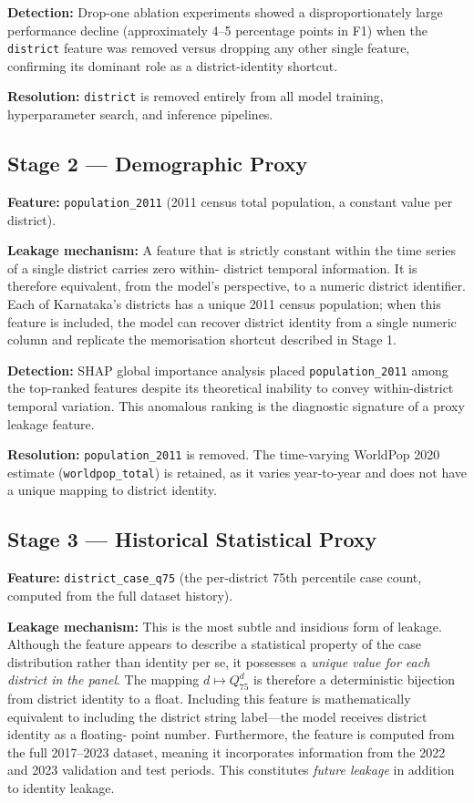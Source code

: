 \documentclass[conference]{IEEEtran}
\begin{document}
\textbf{Detection:} Drop-one ablation experiments showed a
disproportionately large performance decline (approximately 4--5
percentage points in F1) when the \texttt{district} feature was
removed versus dropping any other single feature, confirming its
dominant role as a district-identity shortcut.

\textbf{Resolution:} \texttt{district} is removed entirely from all
model training, hyperparameter search, and inference pipelines.

\subsection{Stage 2 --- Demographic Proxy}

\textbf{Feature:} \texttt{population\_2011} (2011 census total
population, a constant value per district).

\textbf{Leakage mechanism:} A feature that is strictly constant
within the time series of a single district carries zero within-
district temporal information. It is therefore equivalent, from the
model's perspective, to a numeric district identifier. Each of
Karnataka's districts has a unique 2011 census population; when this
feature is included, the model can recover district identity from a
single numeric column and replicate the memorisation shortcut
described in Stage 1.

\textbf{Detection:} SHAP global importance analysis placed
\texttt{population\_2011} among the top-ranked features despite its
theoretical inability to convey within-district temporal variation.
This anomalous ranking is the diagnostic signature of a proxy
leakage feature.

\textbf{Resolution:} \texttt{population\_2011} is removed.
The time-varying WorldPop 2020 estimate (\texttt{worldpop\_total})
is retained, as it varies year-to-year and does not have a unique
mapping to district identity.

\subsection{Stage 3 --- Historical Statistical Proxy}
\label{subsec:q75_leakage}

\textbf{Feature:} \texttt{district\_case\_q75} (the per-district
75th percentile case count, computed from the full dataset history).

\textbf{Leakage mechanism:} This is the most subtle and insidious
form of leakage. Although the feature appears to describe a
statistical property of the case distribution rather than identity
per se, it possesses a \emph{unique value for each district in the
panel}. The mapping $d \mapsto Q_{75}^{d}$ is therefore a
deterministic bijection from district identity to a float. Including
this feature is mathematically equivalent to including the district
string label---the model receives district identity as a floating-
point number. Furthermore, the feature is computed from the full
2017--2023 dataset, meaning it incorporates information from the
2022 and 2023 validation and test periods. This constitutes
\emph{future leakage} in addition to identity leakage.
\end{document}
